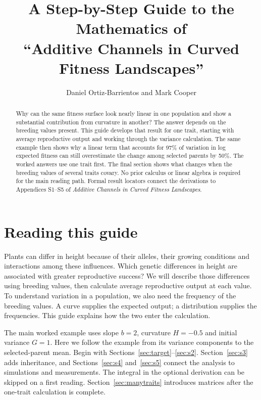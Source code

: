 \documentclass[11pt]{article}
\title{A Step-by-Step Guide to the Mathematics of\\
``Additive Channels in Curved Fitness Landscapes''}
\author{Daniel Ortiz-Barrientos and Mark Cooper}
\date{}
\newcounter{answer}
\begin{document}
\maketitle

\begin{abstract}
Why can the same fitness surface look nearly linear in one population and show a substantial contribution from curvature in another? The answer depends on the breeding values present. This guide develops that result for one trait, starting with average reproductive output and working through the variance calculation. The same example then shows why a linear term that accounts for 97\% of variation in log expected fitness can still overestimate the change among selected parents by 50\%. The worked answers use one trait first. The final section shows what changes when the breeding values of several traits covary. No prior calculus or linear algebra is required for the main reading path. Formal result locators connect the derivations to Appendices S1--S5 of \emph{Additive Channels in Curved Fitness Landscapes}.
\end{abstract}

\tableofcontents
\clearpage

\section{Reading this guide}
\label{sec:purpose}

Plants can differ in height because of their alleles, their growing conditions and interactions among these influences. Which genetic differences in height are associated with greater reproductive success? We will describe those differences using breeding values, then calculate average reproductive output at each value. To understand variation in a population, we also need the frequency of the breeding values. A curve supplies the expected output; a distribution supplies the frequencies. This guide explains how the two enter the calculation.

The main worked example uses slope $b=2$, curvature $H=-0.5$ and initial variance $G=1$. Here we follow the example from its variance components to the selected-parent mean. Begin with Sections~\ref{sec:target}--\ref{sec:s2}. Section~\ref{sec:s3} adds inheritance, and Sections~\ref{sec:s4} and~\ref{sec:s5} connect the analysis to simulations and measurements. The integral in the optional derivation can be skipped on a first reading. Section~\ref{sec:manytraits} introduces matrices after the one-trait calculation is complete.
\end{document}
